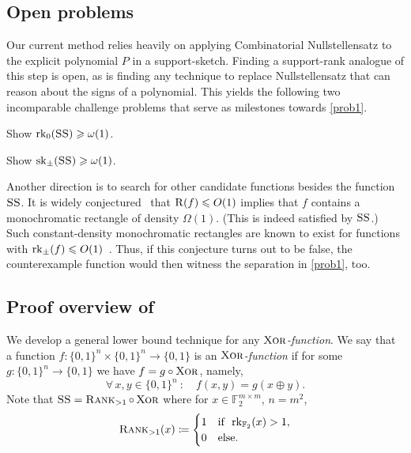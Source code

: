 \documentclass{article}
\begin{document}
\subsection{Open problems}

Our current method relies heavily on applying Combinatorial Nullstellensatz to the explicit polynomial $P$ in a support-sketch. Finding a support-rank analogue of this step is open, as is finding any technique to replace Nullstellensatz that can reason about the signs of a polynomial. This yields the following two incomparable challenge problems that serve as milestones towards \cref{prob1}.
 
\begin{boxquestion}
    Show $\operatorname{rk}_0(\operatorname{\textsc{SS}})\geqslant \omega(1)$.
\end{boxquestion}

\begin{boxquestion}
    Show $\operatorname{sk}_\pm(\operatorname{\textsc{SS}})\geqslant \omega(1)$.  
\end{boxquestion}


Another direction is to search for other candidate functions besides the function $\operatorname{\textsc{SS}}$. It is widely conjectured~\cite{GKPW18,CLV19,HHH23,HH24,GHRS26,Balla2025} that $\operatorname{R}(f)\leqslant O(1)$ implies that $f$ contains a monochromatic rectangle of density $\Omega(1)$. (This is indeed satisfied by $\operatorname{\textsc{SS}}$.) Such constant-density monochromatic rectangles are known to exist for functions with $\operatorname{rk}_\pm(f)\leqslant O(1)$~\cite{APP+2005}. Thus, if this conjecture turns out to be false, the counterexample function would then witness the separation in \cref{prob1}, too.
 

\subsection{Proof overview of } \label{section:techniques}
We develop a general lower bound technique for any \emph{$\operatorname{\textsc{Xor}}$-function}.
    We say that a function $f\colon\{0,1\}^n\times \{0,1\}^n\to\{0,1\}$ is an \emph{$\operatorname{\textsc{Xor}}$-function} if for some $g\colon\{0,1\}^n\to \{0,1\}$ we have $f = g\circ \operatorname{\textsc{Xor}}$, namely,
    \[
        \forall\, x,y\in \{0,1\}^n\ \colon\quad
        f(x, y) = g(x \oplus y).
    \]
Note that $\operatorname{\textsc{SS}} =\operatorname{\textsc{Rank}}_{>1}\circ\operatorname{\textsc{Xor}}$ where for $x\in \mathbb{F}_2^{m\times m}$, $n=m^2$,
\[
\operatorname{\textsc{Rank}}_{>1}(x)\coloneqq
\begin{cases}
1 &\text{if}\enspace \operatorname{rk}_{\mathbb{F}_2}(x)>1, \\
0 &\text{else}.
\end{cases}
\]
\end{document}
